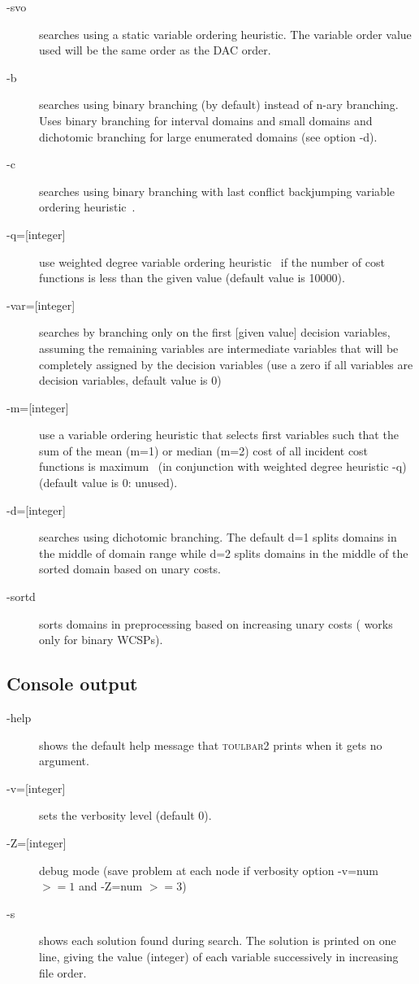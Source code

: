 \documentclass{article}
\def\toulbar2{\textsc{toulbar2}}
\begin{document}
\begin{description}
\item[-svo] searches using a static variable ordering heuristic. The
  variable order value used will be the same order as the DAC order.
\item[-b] searches using binary branching (by default) instead of n-ary branching.
  Uses binary branching for interval domains and small domains
  and dichotomic branching for large enumerated domains (see option -d).
\item[-c] searches using binary branching with last conflict
  backjumping variable ordering heuristic~\cite{Lecoutre09}.
\item[{-q=[integer]}] use
  weighted degree variable ordering heuristic~\cite{boussemart2004} if the number of cost
  functions is less than the given value (default value is 10000).
\item[{-var=[integer]}]
  searches by branching only on the first [given value]
  decision variables, assuming the remaining variables are
  intermediate variables that will be completely assigned by the
  decision variables (use a zero if all variables are decision
  variables, default value is 0)
\item[{-m=[integer]}]
  use a variable ordering heuristic that selects first variables such
  that the sum of the mean (m=1) or median (m=2) cost of all incident
  cost functions is maximum~\cite{Schiex14a} (in conjunction with weighted degree
  heuristic -q) (default value is 0: unused).
\item[{-d=[integer]}]
  searches using dichotomic branching. The default d=1 splits domains
  in the middle of domain range while d=2 splits domains in the middle
  of the sorted domain based on unary costs. 
\item[-sortd] sorts domains in preprocessing based on increasing unary costs ( works only for binary WCSPs).
\end{description}

\subsection{Console output}

\begin{description}
\item[-help] shows the default help message that \toulbar2 prints when
  it gets no argument.
\item[{-v=[integer]}] sets the verbosity level (default 0).
\item[{-Z=[integer]}] debug mode (save problem at each node if verbosity
  option -v=num $>= 1$ and -Z=num $>=3$)
\item[-s] shows each solution found during search. The solution is
  printed on one line, giving the value (integer) of each variable
  successively in increasing file order.
\end{description}
\end{document}
